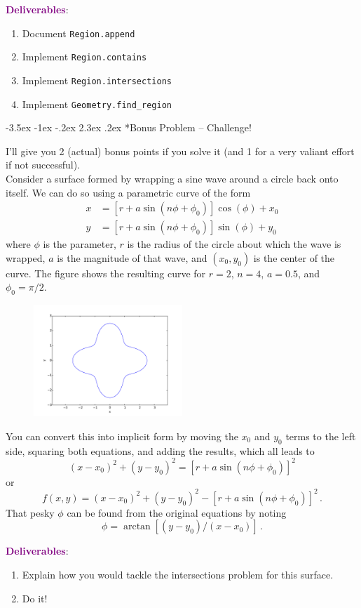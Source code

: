 \documentclass[12pt]{article}
\makeatletter
\renewcommand\section{\@startsection{section}{1}{\z@}%
                                  {-3.5ex \@plus -1ex \@minus -.2ex}%
                                  {2.3ex \@plus.2ex}%
                                  {\normalfont\bfseries}}
\makeatother
\begin{document}
{\bf \textcolor{purple}{Deliverables}}:
\begin{enumerate}
 \item Document {\tt Region.append}  
 \item Implement {\tt Region.contains}
 \item Implement {\tt Region.intersections}
 \item Implement {\tt Geometry.find\_region}
\end{enumerate}

\section*{Bonus Problem -- Challenge!}

I'll give you 2 (actual) bonus points
if you solve it (and 1 for a very valiant effort 
if not successful).\\

Consider a surface formed by wrapping a sine wave around a circle
back onto itself.  We can do so using a parametric curve of the 
form 
\begin{equation}
\begin{split}
  x &= [r+a\sin(n\phi+\phi_0)]\cos(\phi) + x_0 \\
  y &= [r+a\sin(n\phi+\phi_0)]\sin(\phi) + y_0
\end{split}
\end{equation}
where $\phi$ is the parameter, $r$ is the radius of the circle about 
which the wave is wrapped, $a$ is the magnitude of that wave, 
and $(x_0, y_0)$ is the center of the curve. The figure shows 
the resulting curve for
$r=2$, $n = 4$, $a = 0.5$, and $\phi_0 = \pi/2$.

\begin{figure}[h]
 \includegraphics[width=0.5\textwidth]{nonlinear}
\end{figure}

You can convert this into implicit form by moving the $x_0$ and $y_0$
terms to the left side, squaring both equations, and adding the results, which
all leads to 
\begin{equation}
  (x-x_0)^2 + (y-y_0)^2 = [r+a\sin(n\phi+\phi_0)]^2
\end{equation}
or 
\begin{equation}
 f(x, y) = (x-x_0)^2 + (y-y_0)^2 - [r+a\sin(n\phi+\phi_0)]^2 \, .
\end{equation}
That pesky $\phi$ can be found from the original equations by 
noting
\begin{equation}
 \phi = \arctan [(y-y_0)/(x-x_0)] \, .
\end{equation}



{\bf \textcolor{purple}{Deliverables}}:
\begin{enumerate}
 \item Explain how you would tackle the intersections problem 
       for this surface.
 \item Do it!
\end{enumerate}
\end{document}

